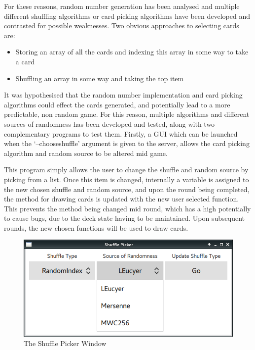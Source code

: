 For these reasons, random number generation has been analysed and multiple
different shuffling algorithms or card picking algorithms have been
developed and contrasted for possible weaknesses. Two obvious approaches to 
selecting cards are:

\begin{itemize}
    \item Storing an array of all the cards and indexing this array in some way to take a card
    \item Shuffling an array in some way and taking the top item
\end{itemize}

\newpage

It was hypothesised that the random number implementation and card picking
algorithms could effect the cards generated, and potentially lead to a more
predictable, non random game. For this reason, multiple algorithms and
different sources of randomness has been developed and tested, along with two
complementary programs to test them. Firstly, a GUI which can be launched
when the `--chooseshuffle' argument is given to the server, allows the card
picking algorithm and random source to be altered mid game.

This program simply allows the user to change the shuffle and random source
by picking from a list. Once this item is changed, internally a variable is
assigned to the new chosen shuffle and random source, and upon the round
being completed, the method for drawing cards is updated with the new user
selected function. This prevents the method being changed mid round, which
has a high potentially to cause bugs, due to the deck state having to be
maintained. Upon subsequent rounds, the new chosen functions will be used
to draw cards.

\begin{figure}[H]
    \centering
    \includegraphics[width=0.8\linewidth]{../images/shufflepicker.png}
    \caption{The Shuffle Picker Window}%
    \label{fig:shufflepicker}
\end{figure}


